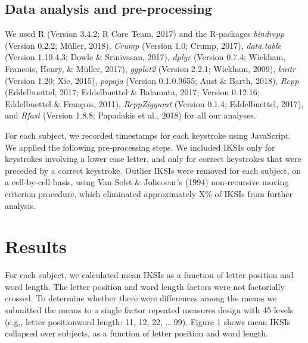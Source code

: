 \documentclass[man]{apa6}
\theoremstyle{definition}
\theoremstyle{definition}
\theoremstyle{definition}
\theoremstyle{remark}
\begin{document}
\subsection{Data analysis and
pre-processing}\label{data-analysis-and-pre-processing}

We used R (Version 3.4.2; R Core Team, 2017) and the R-packages
\emph{bindrcpp} (Version 0.2.2; Müller, 2018), \emph{Crump} (Version
1.0; Crump, 2017), \emph{data.table} (Version 1.10.4.3; Dowle \&
Srinivasan, 2017), \emph{dplyr} (Version 0.7.4; Wickham, Francois,
Henry, \& Müller, 2017), \emph{ggplot2} (Version 2.2.1; Wickham, 2009),
\emph{knitr} (Version 1.20; Xie, 2015), \emph{papaja} (Version
0.1.0.9655; Aust \& Barth, 2018), \emph{Rcpp} (Eddelbuettel, 2017;
Eddelbuettel \& Balamuta, 2017; Version 0.12.16; Eddelbuettel \&
François, 2011), \emph{RcppZiggurat} (Version 0.1.4; Eddelbuettel,
2017), and \emph{Rfast} (Version 1.8.8; Papadakis et al., 2018) for all
our analyses.

For each subject, we recorded timestamps for each keystroke using
JavaScript. We applied the following pre-processing steps. We included
IKSIs only for keystrokes involving a lower case letter, and only for
correct keystrokes that were preceded by a correct keystroke. Outlier
IKSIs were removed for each subject, on a cell-by-cell basis, using Van
Selst \& Jolicoeur's (1994) non-recursive moving criterion procedure,
which eliminated approximately X\% of IKSIs from further analysis.

\section{Results}\label{results}

For each subject, we calculated mean IKSIs as a function of letter
position and word length. The letter position and word length factors
were not factorially crossed. To determine whether there were
differences among the means we submitted the means to a single factor
repeated measures design with 45 levels (e.g., letter
position\textbar{}word length: 1\textbar{}1, 1\textbar{}2, 2\textbar{}2,
\ldots{} 9\textbar{}9). Figure 1 shows mean IKSIs collapsed over
subjects, as a function of letter position and word length.
\end{document}
